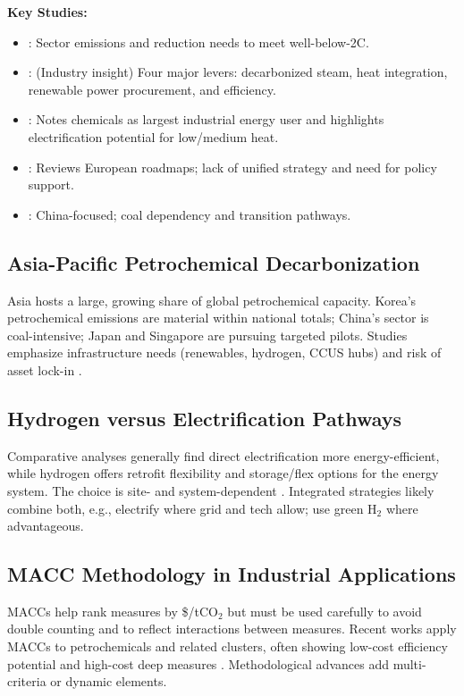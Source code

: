 \documentclass[11pt]{article}
\begin{document}
\textbf{Key Studies:}
\begin{itemize}
    \item \citet{SBTi2022}: Sector emissions and reduction needs to meet well-below-2\degree C.
    \item \citet{McKinsey2023}: (Industry insight) Four major levers: decarbonized steam, heat integration, renewable power procurement, and efficiency.
    \item \citet{IEA2023}: Notes chemicals as largest industrial energy user and highlights electrification potential for low/medium heat.
    \item \citet{Kloo2024}: Reviews European roadmaps; lack of unified strategy and need for policy support.
    \item \citet{RMI2022}: China-focused; coal dependency and transition pathways.
\end{itemize}

\subsection{Asia-Pacific Petrochemical Decarbonization}
Asia hosts a large, growing share of global petrochemical capacity. Korea’s petrochemical emissions are material within national totals; China’s sector is coal-intensive; Japan and Singapore are pursuing targeted pilots. Studies emphasize infrastructure needs (renewables, hydrogen, CCUS hubs) and risk of asset lock-in \citep{GESI2024,RMI2022,Li2023,InvestKorea2023,Wattanasoponvanij2025}.

\subsection{Hydrogen versus Electrification Pathways}
Comparative analyses generally find direct electrification more energy-efficient, while hydrogen offers retrofit flexibility and storage/flex options for the energy system. The choice is site- and system-dependent \citep{Diesing2025,Leicher2023,Wattanasoponvanij2025}. Integrated strategies likely combine both, e.g., electrify where grid and tech allow; use green H$_2$ where advantageous.

\subsection{MACC Methodology in Industrial Applications}
MACCs help rank measures by \$/tCO$_2$ but must be used carefully to avoid double counting and to reflect interactions between measures. Recent works apply MACCs to petrochemicals and related clusters, often showing low-cost efficiency potential and high-cost deep measures \citep{Cederschiold2020,Chen2019,Kesicki2021}. Methodological advances add multi-criteria or dynamic elements.
\end{document}
